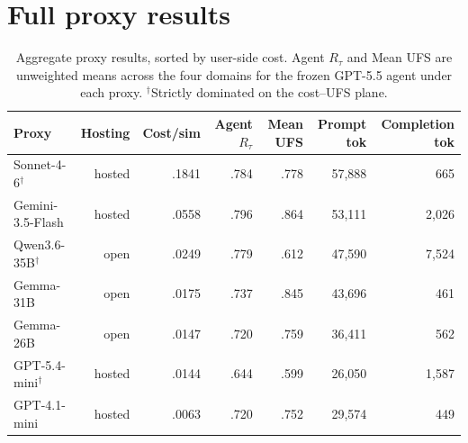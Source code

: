 \documentclass{article}
\begin{document}
\section{Full proxy results}
\begin{table}[H]
\centering
\small
\setlength{\tabcolsep}{3.1pt}
\begin{tabular}{lrrrrrr}
\toprule
Proxy & Hosting & Cost/sim & Agent $R_{\tau}$ & Mean UFS & Prompt tok & Completion tok \\
\midrule
Sonnet-4-6$^{\dagger}$ & hosted & .1841 & .784 & .778 & 57,888 & 665 \\
Gemini-3.5-Flash & hosted & .0558 & .796 & .864 & 53,111 & 2,026 \\
Qwen3.6-35B$^{\dagger}$ & open & .0249 & .779 & .612 & 47,590 & 7,524 \\
Gemma-31B & open & .0175 & .737 & .845 & 43,696 & 461 \\
Gemma-26B & open & .0147 & .720 & .759 & 36,411 & 562 \\
GPT-5.4-mini$^{\dagger}$ & hosted & .0144 & .644 & .599 & 26,050 & 1,587 \\
GPT-4.1-mini & hosted & .0063 & .720 & .752 & 29,574 & 449 \\
\bottomrule
\end{tabular}
\caption{Aggregate proxy results, sorted by user-side cost. Agent $R_{\tau}$ and Mean UFS are unweighted means across the four domains for the frozen GPT-5.5 agent under each proxy. $^{\dagger}$Strictly dominated on the cost--UFS plane.}
\label{tab:aggregate}
\end{table}
\end{document}
